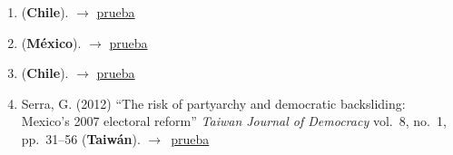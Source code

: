 \documentclass[12 pt, letter]{article}
\newenvironment{CitasMiTrabajo}{
    \begin{footnotesize}
    \begin{enumerate}[label={\footnotesize\emph{cita~\arabic*}},ref=\arabic*] %
        \setlength{\itemsep}{.1\itemsep}
        \setlength{\parskip}{.1\parskip}
    }{\end{enumerate}\end{footnotesize}}
\begin{document}
        \begin{CitasMiTrabajo}

        \item {} (\textbf{Chile}). $\rightarrow$ \href{https://github.com/emagar/cv/blob/master/citasMiTrab/magarRomero2008/maldonado2013.pdf}{prueba}

        \item {} (\textbf{México}). $\rightarrow$ \href{https://github.com/emagar/cv/blob/master/citasMiTrab/magarRomero2008/miranda2019.pdf}{prueba}
          
        \item {} (\textbf{Chile}). $\rightarrow$ \href{https://github.com/emagar/cv/blob/master/citasMiTrab/magarRomero2008/palma2010.pdf}{prueba}

        \item Serra, G. (2012)
            ``The risk of partyarchy and democratic backsliding: Mexico's 2007 electoral reform''
            \emph{Taiwan Journal of Democracy}
            vol.\ 8, no.\ 1, pp.\ 31--56 (\textbf{Taiw\'an}). $\rightarrow$~\href{https://github.com/emagar/cv/blob/master/citasMiTrab/estevezEtalElecStud/serraElecRefMexico2012tjd.pdf}{prueba}

        \label{ncites:magar.romero.2008} %

        \end{CitasMiTrabajo}

\end{document}
